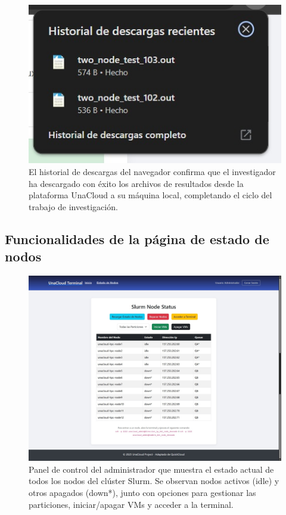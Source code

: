 \begin{figure}[H]
    \centering
    \includegraphics[width=0.75\linewidth]{Documento Final/Imagenes/ExportSuccesfully.jpg}
    \caption{El historial de descargas del navegador confirma que el investigador ha descargado con éxito los archivos de resultados desde la plataforma UnaCloud a su máquina local, completando el ciclo del trabajo de investigación.}
    \label{fig:ExportSuccesfully}
\end{figure}

\subsection{Funcionalidades de la página de estado de nodos}

\begin{figure}[H]
    \centering
    \includegraphics[width=0.75\linewidth]{Documento Final/Imagenes/EstadoNodo_Admin.jpg}
    \caption{Panel de control del administrador que muestra el estado actual de todos los nodos del clúster Slurm. Se observan nodos activos (idle) y otros apagados (down*), junto con opciones para gestionar las particiones, iniciar/apagar VMs y acceder a la terminal.}
    \label{fig:NodeState}
\end{figure}

